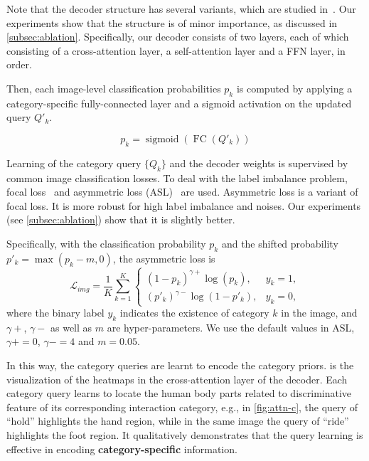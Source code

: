 \documentclass[10pt,twocolumn,letterpaper]{article}
\begin{document}
Note that the decoder structure has several variants, which are studied in~\cite{cheng2022mask2former}. Our experiments show that the structure is of minor importance, as discussed in \cref{subsec:ablation}. Specifically, our decoder consists of two layers, each of which consisting of a cross-attention layer, a self-attention layer and a FFN layer, in order.

Then, each image-level classification probabilities $p_{k}$ is computed by applying a category-specific fully-connected layer and a sigmoid activation on the updated query $Q'_k$.

\begin{equation}
    p_{k} = \operatorname{sigmoid}(\operatorname{FC}(Q'_{k}))
    \label{eq.img_classification}
\end{equation}

Learning of the category query $\{Q_k\}$ and the decoder weights is supervised by common image classification losses. To deal with the label imbalance problem, focal loss~\cite{lin2017focal} and asymmetric loss (ASL)~\cite{ridnik2021asymmetric} are used. Asymmetric loss is a variant of focal loss. It is more robust for high label imbalance and noises. Our experiments (see \cref{subsec:ablation}) show that it is slightly better.

Specifically, with the classification probability $p_{k}$ and the shifted probability $p'_{k} = \max \left(p_{k} - m, 0 \right)$, the asymmetric loss is
\begin{equation}
    \mathcal{L}_{img} = 
    \frac{1}{K} \sum_{k=1}^{K}
    \left\{\begin{array}{ll}
    \left( 1-p_{k} \right)^{\gamma+} \log \left( p_{k} \right), & y_{k}=1, \\
    \left( p'_{k} \right) ^{\gamma-} \log \left( 1 - p'_{k} \right), & y_{k}=0,
    \end{array}\right.
\label{eq.img_cls_loss}
\end{equation}
where the binary label $y_{k}$ indicates the existence of category $k$ in the image, and $\gamma+$, $\gamma-$ as well as $m$ are hyper-parameters. We use the default values in ASL\cite{ridnik2021asymmetric}, $\gamma+ = 0$, $\gamma- = 4$ and $m = 0.05$. 

In this way, the category queries are learnt to encode the category priors.  is the visualization of the heatmaps in the cross-attention layer of the decoder. Each category query learns to locate the human body parts related to discriminative feature of its corresponding interaction category, e.g., in \cref{fig:attn-c}, the query of ``hold'' highlights the hand region, while in the same image the query of ``ride'' highlights the foot region. It qualitatively demonstrates that the query learning is effective in encoding \textbf{category-specific} information.
\end{document}
